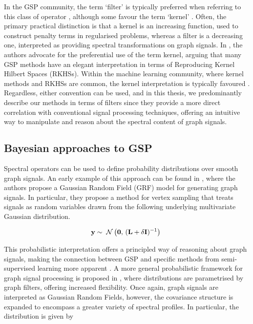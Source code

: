 In the GSP community, the term `filter' is typically preferred when referring to this class of operator \citep{Shuman2013}, although some favour the term `kernel' \citep{Ioannidis2016, Romero2017}. Often, the primary practical distinction is that a kernel is an increasing function, used to construct penalty terms in regularised problems, whereas a filter is a decreasing one, interpreted as providing spectral transformations on graph signals. In \cite{Romero2017b}, the authors advocate for the preferential use of the term kernel, arguing that many GSP methods have an elegant interpretation in terms of Reproducing Kernel Hilbert Spaces (RKHSs). Within the machine learning community, where kernel methods and RKHSs are common, the kernel interpretation is typically favoured \citep{Kondor2002, Smola2003}. Regardless, either convention can be used, and in this thesis, we predominantly describe our methods in terms of filters since they provide a more direct correlation with conventional signal processing techniques, offering an intuitive way to manipulate and reason about the spectral content of graph signals.


\subsection{Bayesian approaches to GSP}

Spectral operators can be used to define probability distributions over smooth graph signals. An early example of this approach can be found in \cite{Gadde2015}, where the authors propose a Gaussian Random Field (GRF) model for generating graph signals. In particular, they propose a method for vertex sampling that treats signals as random variables drawn from the following underlying multivariate Gaussian distribution.

\begin{equation}
\mathbf{y} \sim \; \mathcal{N}\left(\mathbf{0}, \, (\mathbf{L} + \delta \mathbf{I})^{-1}\right) \;
\end{equation}

This probabilistic interpretation offers a principled way of reasoning about graph signals, making the connection between GSP and specific methods from semi-supervised learning more apparent \citep{Zhu2003}. A more general probabilistic framework for graph signal processing is proposed in \cite{Zhang2015}, where distributions are parametrised by graph filters, offering increased flexibility. Once again, graph signals are interpreted as Gaussian Random Fields, however, the covariance structure is expanded to encompass a greater variety of spectral profiles. In particular, the distribution is given by 

